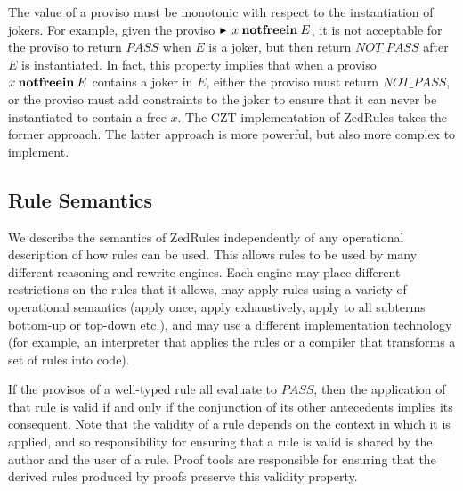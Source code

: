 \documentclass{entcs}
\begin{document}
The value of a proviso must be
monotonic with respect to the instantiation of jokers.  For example,
given the proviso $\proviso x \notfreein E$, it is not acceptable for
the proviso to return $PASS$ when $E$ is a joker, but then return
$NOT\_PASS$ after $E$ is instantiated.  In fact, this property implies
that when a proviso $x \mathbin{\mathop{\mathstrut{\mbox{\textbf{notfreein}}}}\nolimits} E$ contains a joker in $E$, either
the proviso must return $NOT\_PASS$, or the proviso must add
constraints to the joker to ensure that it can never be instantiated
to contain a free $x$.  The CZT implementation of ZedRules takes the
former approach.  The latter approach is more powerful, but also more
complex to implement.


\subsection{Rule Semantics}

We describe the semantics of ZedRules independently of any operational
description of how rules can be used.  This allows rules to be used by
many different reasoning and rewrite engines.  Each engine may place
different restrictions on the rules that it allows, may apply rules
using a variety of operational semantics (apply once, apply
exhaustively, apply to all subterms bottom-up or top-down etc.), and
may use a different implementation technology (for example, an
interpreter that applies the rules or a compiler that transforms a set
of rules into code).

If the provisos of a well-typed rule all evaluate to $PASS$,
then the application of that rule is valid if and only if
the conjunction of its other antecedents implies its consequent.
Note that the validity of a rule depends on the context in which it is applied,
and so responsibility for ensuring that a rule is valid
is shared by the author and the user of a rule.
%
%
Proof tools are
responsible for ensuring that the derived rules produced by proofs
preserve this validity property.
\end{document}
